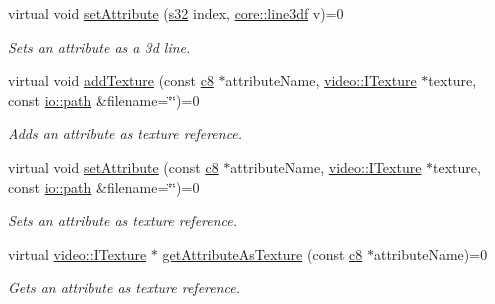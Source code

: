 \begin{DoxyCompactItemize}
\mbox{\label{classirr_1_1io_1_1IAttributes_ad39ffaf8f149906be60f9ef71dff9110}} 
virtual void \hyperlink{classirr_1_1io_1_1IAttributes_ad39ffaf8f149906be60f9ef71dff9110}{set\+Attribute} (\hyperlink{namespaceirr_ac66849b7a6ed16e30ebede579f9b47c6}{s32} index, \hyperlink{namespaceirr_1_1core_acadb288f9aca3bf2d1222abcdf77114e}{core\+::line3df} v)=0
\begin{DoxyCompactList}\small\item\em Sets an attribute as a 3d line. \end{DoxyCompactList}\item 
\mbox{\label{classirr_1_1io_1_1IAttributes_a3e2ee4641f97a67bd9be924d1e2b8f2c}} 
virtual void \hyperlink{classirr_1_1io_1_1IAttributes_a3e2ee4641f97a67bd9be924d1e2b8f2c}{add\+Texture} (const \hyperlink{namespaceirr_a9395eaea339bcb546b319e9c96bf7410}{c8} $\ast$attribute\+Name, \hyperlink{classirr_1_1video_1_1ITexture}{video\+::\+I\+Texture} $\ast$texture, const \hyperlink{namespaceirr_1_1io_a6468281622ce3a1c46b72e19f32dded5}{io\+::path} \&filename=\char`\"{}\char`\"{})=0
\begin{DoxyCompactList}\small\item\em Adds an attribute as texture reference. \end{DoxyCompactList}\item 
\mbox{\label{classirr_1_1io_1_1IAttributes_a8d7bd343b16d026b58ea2f5d175fd022}} 
virtual void \hyperlink{classirr_1_1io_1_1IAttributes_a8d7bd343b16d026b58ea2f5d175fd022}{set\+Attribute} (const \hyperlink{namespaceirr_a9395eaea339bcb546b319e9c96bf7410}{c8} $\ast$attribute\+Name, \hyperlink{classirr_1_1video_1_1ITexture}{video\+::\+I\+Texture} $\ast$texture, const \hyperlink{namespaceirr_1_1io_a6468281622ce3a1c46b72e19f32dded5}{io\+::path} \&filename=\char`\"{}\char`\"{})=0
\begin{DoxyCompactList}\small\item\em Sets an attribute as texture reference. \end{DoxyCompactList}\item 
virtual \hyperlink{classirr_1_1video_1_1ITexture}{video\+::\+I\+Texture} $\ast$ \hyperlink{classirr_1_1io_1_1IAttributes_a2044beb7dcf310beb95ed0f4008f2b27}{get\+Attribute\+As\+Texture} (const \hyperlink{namespaceirr_a9395eaea339bcb546b319e9c96bf7410}{c8} $\ast$attribute\+Name)=0
\begin{DoxyCompactList}\small\item\em Gets an attribute as texture reference. \end{DoxyCompactList}\item 

\end{DoxyCompactItemize}
